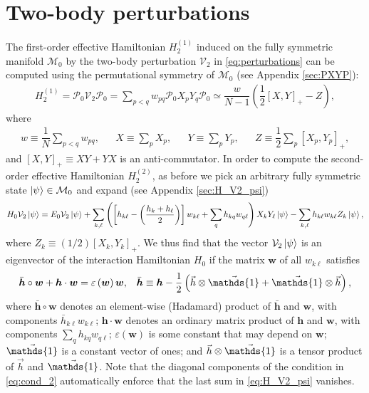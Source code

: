 \documentclass[nofootinbib,notitlepage,11pt]{revtex4-2}
\newcommand{\f}[2]{\dfrac{#1}{#2}} %
\newcommand{\p}[1]{\left(#1\right)} %
\renewcommand{\sp}[1]{\left[#1\right]} %
\renewcommand{\c}{\cdot} %
\renewcommand{\oc}{\circ} %
\newcommand{\m}{\bm} %
\renewcommand{\v}{\vec} %
\newcommand{\1}{\mathds{1}}
\newcommand{\e}{\varepsilon}
\newcommand{\M}{\mathcal{M}}
\renewcommand{\P}{\mathcal{P}}
\newcommand{\V}{\mathcal{V}}
\begin{document}
\section{Two-body perturbations}

The first-order effective Hamiltonian $H_2^{(1)}$ induced on the fully
symmetric manifold $\M_0$ by the two-body perturbation $\V_2$ in
\eqref{eq:perturbations} can be computed using the permutational
symmetry of $\M_0$ (see Appendix \ref{sec:PXYP}):
\begin{align}
  H_2^{(1)}
  = \P_0 \V_2 \P_0
  = \sum_{p<q} w_{pq} \P_0 X_p Y_q \P_0
  \simeq \f{w}{N-1} \p{\f12 \sp{X,Y}_+ - Z},
\end{align}
where
\begin{align}
  w \equiv \f1N \sum_{p<q} w_{pq},
  &&
  X \equiv \sum_p X_p,
  &&
  Y \equiv \sum_p Y_p,
  &&
  Z \equiv \f12 \sum_p \sp{X_p, Y_p}_+,
\end{align}
and $\sp{X,Y}_+\equiv XY+YX$ is an anti-commutator.  In order to
compute the second-order effective Hamiltonian $H_2^{(2)}$, as before
we pick an arbitrary fully symmetric state $\ket\psi\in\M_0$ and
expand (see Appendix \ref{sec:H_V2_psi})
\begin{align}
  H_0 \V_2 \ket\psi
  = E_0 \V_2 \ket\psi
  + \sum_{k,\ell} \p{\sp{h_{k\ell}-\p{\f{h_k+h_\ell}{2}}} w_{k\ell}
    + \sum_q h_{kq} w_{q\ell}} X_k Y_\ell \ket\psi
  - \sum_{k,\ell} h_{k\ell} w_{k\ell} Z_k \ket\psi,
  \label{eq:H_V2_psi}
\end{align}
where $Z_k\equiv\p{1/2}\sp{X_k,Y_k}_+$.  We thus find that the vector
$\V_2\ket\psi$ is an eigenvector of the interaction Hamiltonian $H_0$
if the matrix $\m w$ of all $w_{k\ell}$ satisfies
\begin{align}
  \bar{\m h}\oc\m w + \m h\c\m w = \e\p{\m w} \m w,
  &&
  \bar{\m h}
  \equiv \m h - \f12\p{\v h\otimes\v\1 + \v\1\otimes\v h},
  \label{eq:cond_2}
\end{align}
where $\bar{\m h}\oc\m w$ denotes an element-wise (Hadamard) product
of $\bar{\m h}$ and $\m w$, with components
$\bar h_{k\ell} w_{k\ell}$; $\m h\c\m w$ denotes an ordinary matrix
product of $\m h$ and $\m w$, with components
$\sum_q h_{kq} w_{q\ell}$; $\e\p{\m w}$ is some constant that may
depend on $\m w$; $\v\1$ is a constant vector of ones; and
$\v h\otimes\v\1$ is a tensor product of $\v h$ and $\v\1$.  Note that
the diagonal components of the condition in \eqref{eq:cond_2}
automatically enforce that the last sum in \eqref{eq:H_V2_psi}
vanishes.
\end{document}

